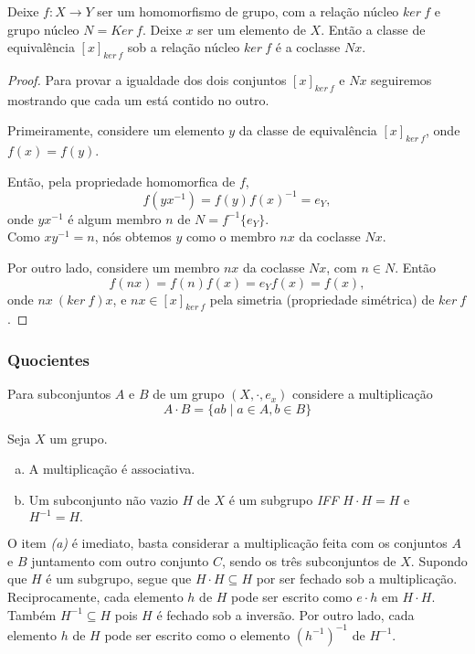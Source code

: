 \begin{stat}
  Deixe $f: X\to Y$ ser um homomorfismo de grupo, com a relação núcleo $ker\ f$ e grupo núcleo $N=Ker\ f$. Deixe $x$ ser um elemento de $X$. Então a classe de equivalência $[x]_{ker\ f}$ sob a relação núcleo $ker\ f$ é a coclasse $Nx$.
  \begin{proof}
    Para provar a igualdade dos dois conjuntos $[x]_{ker\ f}$ e $Nx$ seguiremos mostrando que cada um está contido no outro.

    Primeiramente, considere um elemento $y$ da classe de equivalência $[x]_{ker\ f}$, onde $f(x) = f(y)$.

    Então, pela propriedade homomorfica de $f$, $$f(yx^{-1}) = f(y)f(x)^{-1} = e_{Y},$$ onde $yx^{-1}$ é algum membro $n$ de $N=f^{-1}\{e_{Y}\}$.\\
    Como $xy^{-1} = n$, nós obtemos $y$ como o membro $nx$ da coclasse $Nx$.

    Por outro lado, considere um membro $nx$ da coclasse $Nx$, com $n \in N$. Então $$f(nx)=f(n)f(x)=e_{Y}f(x)=f(x),$$ 
    onde $nx\ (ker\ f) x$, e $nx \in [x]_{ker\ f}$ pela simetria (propriedade simétrica) de $ker\ f$.
  \end{proof}
\end{stat}

\subsubsection{Quocientes}
Para subconjuntos $A$ e $B$ de um grupo $(X,\cdot, e_{x})$ considere a multiplicação
$$A \cdot B = \{ab \mid a \in A , b \in B\}$$
\begin{stat}
  Seja $X$ um grupo.
  \begin{enumerate}[(a)]
    \item A multiplicação é associativa.
    \item Um subconjunto não vazio $H$ de $X$ é um subgrupo \emph{IFF} $H \cdot H = H$ e $H^{-1} = H.$
  \end{enumerate} 
\end{stat}
O item \emph{(a)} é imediato, basta considerar a multiplicação feita com os conjuntos $A$ e $B$ juntamento com outro conjunto $C$, sendo os três subconjuntos de $X$. Supondo que $H$ é um subgrupo, segue que $H\cdot H \subseteq H$ por ser fechado sob a multiplicação. Reciprocamente, cada elemento $h$ de $H$ pode ser escrito como $e\cdot h$ em $H\cdot H$.
Também $H^{-1} \subseteq H$ pois $H$ é fechado sob a inversão. Por outro lado, cada elemento $h$ de $H$ pode ser escrito como o elemento $(h^{-1})^{-1}$ de $H^{-1}$.

